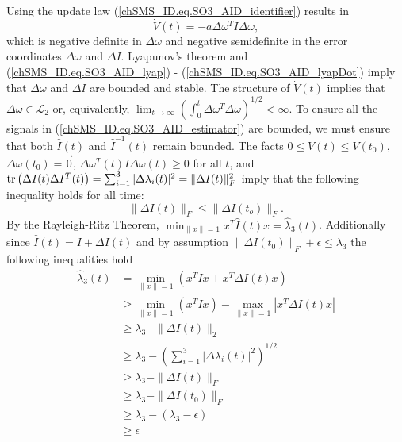 Using the update law (\ref{chSMS_ID.eq.SO3_AID_identifier}) results in
%
\begin{equation}\label{chSMS_ID.eq.SO3_AID_lyapDot}
\dot{V}(t)=-a\Delta\omega^{T}I\Delta\omega,
\end{equation}
%
which is negative definite in $\Delta \omega$ and negative
semidefinite in the error coordinates $\Delta \omega$ and $\Delta I$.
Lyapunov's theorem and (\ref{chSMS_ID.eq.SO3_AID_lyap}) -
(\ref{chSMS_ID.eq.SO3_AID_lyapDot}) imply that $\Delta \omega$ and
$\Delta I$ are bounded and stable.  The structure of $\dot{V}(t)$
implies that $\Delta \omega \in \mathcal{L}_2$ or, equivalently,
$\lim_{t\to\infty}\left( \int_0^t\Delta \omega^T \Delta
  \omega\right)^{1/2}<\infty$.  To ensure all the signals in
(\ref{chSMS_ID.eq.SO3_AID_estimator}) are bounded, we must ensure that
both $\hat{I}(t)$ and $\hat{I}^{-1}(t)$ remain bounded. The facts $0
\leq V(t) \leq V(t_0)$, $\Delta \omega(t_0)=\vec{0}$, $ \Delta \omega
^T(t) I \Delta \omega (t)\geq 0$ for all $t$, and $\operatorname{tr}\left(\Delta
  I(t) \Delta I^T(t)\right)=
\sum_{i=1}^3|\Delta\lambda_i(t)|^2=\|\Delta I(t)\|_F^2$ imply that the
following inequality holds for all time:
%
\begin{equation}
\|\Delta I(t)\|_F\leq \|\Delta I(t_o)\|_F.
\end{equation}
%
By the Rayleigh-Ritz Theorem, $\min_{\|x\|=1} x^T \hat{I}(t)
x=\hat{\lambda}_3(t)$.  Additionally since $\hat{I}(t)=I+\Delta I(t)$
and by assumption $\|\Delta I(t_0)\|_F+\epsilon\leq\lambda_3$ the
following inequalities hold
%
\begin{align}
\hat{\lambda}_3(t)
 &= \min_{\|x\|=1}\left(x^T I x + x^T \Delta I(t) x\right)
\nonumber \\
 &\geq\min_{\|x\|=1}\left(x^T I x\right)-\max_{\|x\|=1}|x^T\Delta I(t)x|
\nonumber \\
 &\geq\lambda_3-\|\Delta I(t)\|_2
\nonumber \\
 &\geq\lambda_3-\left(\sum_{i=1}^3|\Delta\lambda_i(t)|^2\right)^{1/2}
\nonumber \\
 &\geq\lambda_3-\|\Delta I(t)\|_F
\nonumber \\
 &\geq\lambda_3-\|\Delta I(t_0)\|_F
\nonumber \\
 &\geq\lambda_3-\left(\lambda_3-\epsilon\right)
\nonumber \\
 &\geq\epsilon
\end{align}
%
